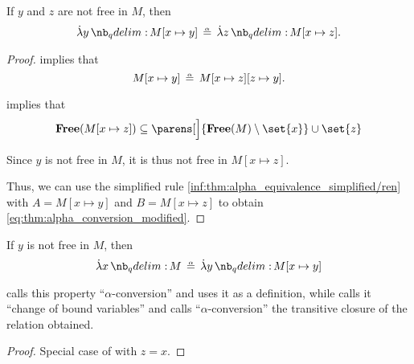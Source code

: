 \begin{corollary}\label{thm:alpha_conversion_modified}
  If \( y \) and \( z \) are not free in \( M \), then
  \begin{equation}\label{eq:thm:alpha_conversion_modified}
    \qabs y M[x \mapsto y] \aequiv \qabs z M[x \mapsto z].
  \end{equation}
\end{corollary}
\begin{proof}
   implies that
  \begin{equation*}
    M[x \mapsto y] \aequiv M[x \mapsto z][z \mapsto y].
  \end{equation*}

   implies that
  \begin{equation*}
    \op*{Free}(M[x \mapsto z]) \subseteq \parens[\Big]{ \op*{Free}(M) \setminus \set{ x } } \cup \set{ z }
  \end{equation*}

  Since \( y \) is not free in \( M \), it is thus not free in \( M[x \mapsto z] \).

  Thus, we can use the simplified rule \ref{inf:thm:alpha_equivalence_simplified/ren} with \( A = M[x \mapsto y] \) and \( B = M[x \mapsto z] \) to obtain \eqref{eq:thm:alpha_conversion_modified}.
\end{proof}

\begin{corollary}\label{thm:alpha_conversion}
  If \( y \) is not free in \( M \), then
  \begin{equation}\label{eq:thm:alpha_conversion}
    \qabs x M \aequiv \qabs y M[x \mapsto y]
  \end{equation}
\end{corollary}
\begin{comments}
  \item {} calls this property \enquote{\( \alpha \)-conversion} and uses it as a definition, while  calls it \enquote{change of bound variables} and calls \enquote{\( \alpha \)-conversion} the transitive closure of the relation obtained.
\end{comments}
\begin{proof}
  Special case of  with \( z = x \).
\end{proof}

